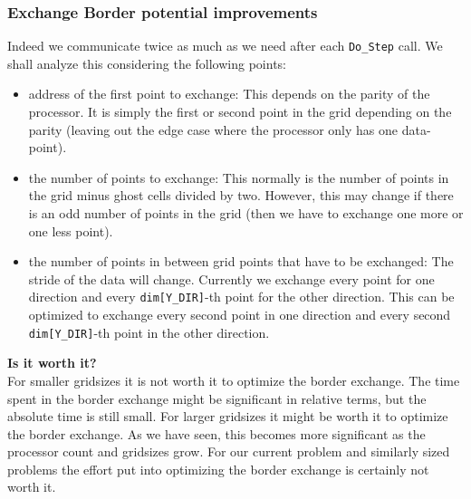 \subsubsection{Exchange Border potential improvements}
Indeed we communicate twice as much as we need after each \texttt{Do\_Step} call. We shall analyze this considering the following points: 
\begin{itemize}
    \item address of the first point to exchange: This depends on the parity of the processor. It is simply the first or second point in the grid depending on the parity (leaving out the edge case where the processor only has one data-point).
    \item the number of points to exchange: This normally is the number of points in the grid minus ghost cells divided by two. However, this may change if there is an odd number of points in the grid (then we have to exchange one more or one less point).
    \item the number of points in between grid points that have to be exchanged: The stride of the data will change. Currently we exchange every point for one direction and every \texttt{dim[Y\_DIR]}-th point for the other direction. This can be optimized to exchange every second point in one direction and every second \texttt{dim[Y\_DIR]}-th point in the other direction. 
\end{itemize}

\textbf{Is it worth it?}\\
For smaller gridsizes it is not worth it to optimize the border exchange. The time spent in the border exchange might be significant in relative terms, but the absolute time is still small. For larger gridsizes it might be worth it to optimize the border exchange. As we have seen, this becomes more significant as the processor count and gridsizes grow. For our current problem and similarly sized problems the effort put into optimizing the border exchange is certainly not worth it.